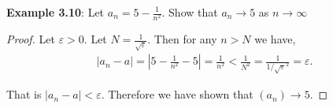 \documentclass{article}
\begin{document}
\textbf{Example 3.10}: Let $a_n = 5 - \frac{1}{n^2}$. Show that $a_n \rightarrow 5$ as $n \rightarrow \infty$

\begin{proof}
	Let $\varepsilon > 0$. Let $N = \tfrac{1}{\sqrt{\varepsilon}}$. Then for any $n > N$ we have,
	\begin{align*}
		|a_n - a| = |5 - \frac{1}{n^2} - 5| = \frac{1}{n^2} < \frac{1}{N^2} = \frac{1}{1 / \sqrt{\varepsilon}^2} = \varepsilon.
	\end{align*}

	That is $|a_n - a| < \varepsilon$. Therefore we have shown that $(a_n) \rightarrow 5$.
\end{proof}
\end{document}

